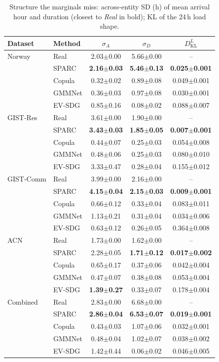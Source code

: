 \documentclass[journal]{IEEEtran}
\begin{document}
\begin{table}[t]
\centering
\caption{Structure the marginals miss: across-entity SD (h) of mean arrival hour and duration (closest to \emph{Real} in bold); KL of the 24\,h load shape.}
\label{tab:heterogeneity}
\footnotesize
\begin{tabular}{llccc}
\toprule
Dataset & Method & $\sigma_A$ & $\sigma_D$ & $D_{\mathrm{KL}}^{L}$ \\
\midrule
Norway & Real & 2.03$\pm$0.00 & 5.66$\pm$0.00 & -- \\
 & SPARC & \textbf{2.16$\pm$0.03} & \textbf{5.46$\pm$0.13} & \textbf{0.025$\pm$0.001} \\
 & Copula & 0.32$\pm$0.02 & 0.89$\pm$0.08 & 0.049$\pm$0.001 \\
 & GMMNet & 0.36$\pm$0.03 & 0.97$\pm$0.08 & 0.030$\pm$0.001 \\
 & EV-SDG & 0.85$\pm$0.16 & 0.08$\pm$0.02 & 0.088$\pm$0.007 \\
\midrule
GIST-Res & Real & 3.61$\pm$0.00 & 1.90$\pm$0.00 & -- \\
 & SPARC & \textbf{3.43$\pm$0.03} & \textbf{1.85$\pm$0.05} & \textbf{0.007$\pm$0.001} \\
 & Copula & 0.44$\pm$0.07 & 0.25$\pm$0.03 & 0.054$\pm$0.008 \\
 & GMMNet & 0.48$\pm$0.06 & 0.25$\pm$0.03 & 0.080$\pm$0.010 \\
 & EV-SDG & 3.33$\pm$0.47 & 0.28$\pm$0.04 & 0.155$\pm$0.012 \\
\midrule
GIST-Comm & Real & 3.99$\pm$0.00 & 2.16$\pm$0.00 & -- \\
 & SPARC & \textbf{4.15$\pm$0.04} & \textbf{2.15$\pm$0.03} & \textbf{0.009$\pm$0.001} \\
 & Copula & 0.66$\pm$0.12 & 0.33$\pm$0.04 & 0.083$\pm$0.011 \\
 & GMMNet & 1.13$\pm$0.21 & 0.31$\pm$0.04 & 0.034$\pm$0.006 \\
 & EV-SDG & 0.63$\pm$0.12 & 0.26$\pm$0.05 & 0.364$\pm$0.008 \\
\midrule
ACN & Real & 1.73$\pm$0.00 & 1.62$\pm$0.00 & -- \\
 & SPARC & 2.28$\pm$0.05 & \textbf{1.71$\pm$0.12} & \textbf{0.017$\pm$0.002} \\
 & Copula & 0.65$\pm$0.17 & 0.37$\pm$0.06 & 0.042$\pm$0.004 \\
 & GMMNet & 0.47$\pm$0.07 & 0.38$\pm$0.08 & 0.053$\pm$0.004 \\
 & EV-SDG & \textbf{1.39$\pm$0.27} & 0.33$\pm$0.07 & 0.178$\pm$0.004 \\
\midrule
Combined & Real & 2.83$\pm$0.00 & 6.68$\pm$0.00 & -- \\
 & SPARC & \textbf{2.86$\pm$0.04} & \textbf{6.53$\pm$0.07} & \textbf{0.019$\pm$0.001} \\
 & Copula & 0.43$\pm$0.03 & 1.07$\pm$0.06 & 0.032$\pm$0.001 \\
 & GMMNet & 0.48$\pm$0.04 & 1.02$\pm$0.07 & 0.038$\pm$0.002 \\
 & EV-SDG & 1.42$\pm$0.44 & 0.06$\pm$0.02 & 0.046$\pm$0.005 \\
\bottomrule
\end{tabular}
\end{table}
\end{document}
